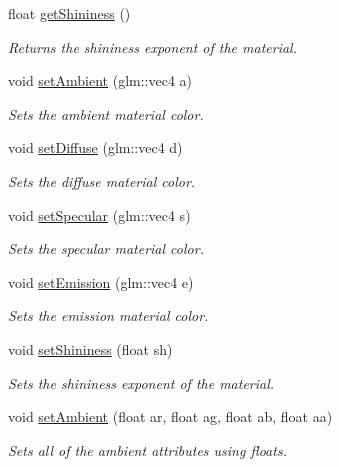 \begin{DoxyCompactItemize}
\mbox{\label{class_material_af4a4b75421a39120c621d26403ed2050}} 
float \hyperlink{class_material_af4a4b75421a39120c621d26403ed2050}{get\+Shininess} ()
\begin{DoxyCompactList}\small\item\em Returns the shininess exponent of the material. \end{DoxyCompactList}\item 
void \hyperlink{class_material_a72f9946f0d3569afa18ae03e275f8dfd}{set\+Ambient} (glm\+::vec4 a)
\begin{DoxyCompactList}\small\item\em Sets the ambient material color. \end{DoxyCompactList}\item 
void \hyperlink{class_material_a700d4a180aeef13e35bb937d4da541df}{set\+Diffuse} (glm\+::vec4 d)
\begin{DoxyCompactList}\small\item\em Sets the diffuse material color. \end{DoxyCompactList}\item 
void \hyperlink{class_material_a99ecd0beb0aae8eed8099a198be9e142}{set\+Specular} (glm\+::vec4 s)
\begin{DoxyCompactList}\small\item\em Sets the specular material color. \end{DoxyCompactList}\item 
void \hyperlink{class_material_ace85799daadb777e5ce13b0326a84895}{set\+Emission} (glm\+::vec4 e)
\begin{DoxyCompactList}\small\item\em Sets the emission material color. \end{DoxyCompactList}\item 
void \hyperlink{class_material_a090352914f8d55b4bc4d3fdda38832c8}{set\+Shininess} (float sh)
\begin{DoxyCompactList}\small\item\em Sets the shininess exponent of the material. \end{DoxyCompactList}\item 
void \hyperlink{class_material_ace31bcfa4a27db13a08fd377a14a6365}{set\+Ambient} (float ar, float ag, float ab, float aa)
\begin{DoxyCompactList}\small\item\em Sets all of the ambient attributes using floats. \end{DoxyCompactList}\item 

\end{DoxyCompactItemize}
